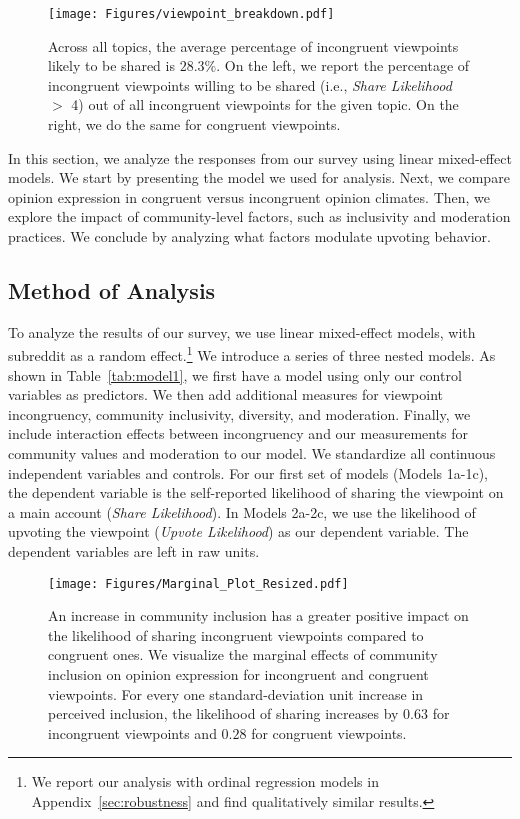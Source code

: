 \begin{figure*}[ht]
    \centering
    \texttt{[image: Figures/viewpoint\_breakdown.pdf]}
    \caption{Across all topics, the average percentage of incongruent viewpoints likely to be shared is $28.3\%$. On the left, we report the percentage of incongruent viewpoints willing to be shared (i.e., \textit{Share Likelihood} $>$ 4) out of all incongruent viewpoints for the given topic. On the right, we do the same for congruent viewpoints.}
    \label{fig:viewpoint_breakdown}
\end{figure*}

In this section, we analyze the responses from our survey using linear mixed-effect models. We start by presenting the model we used for analysis. Next, we compare opinion expression in congruent versus incongruent opinion climates. Then, we explore the impact of community-level factors, such as inclusivity and moderation practices. We conclude by analyzing what factors modulate upvoting behavior.

\subsection{Method of Analysis}
To analyze the results of our survey, we use linear mixed-effect models, with subreddit as a random effect.\footnote{We report our analysis with ordinal regression models in Appendix~\ref{sec:robustness} and find qualitatively similar results.} We introduce a series of three nested models. As shown in Table~\ref{tab:model1}, we first have a model using only our control variables as predictors. We then add additional measures for viewpoint incongruency, community inclusivity, diversity, and moderation. Finally, we include interaction effects between incongruency and our measurements for community values and moderation to our model. We standardize all continuous independent variables and controls. For our first set of models (Models 1a-1c), the dependent variable is the self-reported likelihood of sharing the viewpoint on a main account (\textit{Share Likelihood}). In Models 2a-2c, we use the likelihood of upvoting the viewpoint (\textit{Upvote Likelihood}) as our dependent variable. The dependent variables are left in raw units. 










\begin{figure}[ht!]
    \centering
    \texttt{[image: Figures/Marginal\_Plot\_Resized.pdf]}
    \caption{An increase in community inclusion has a greater positive impact on the likelihood of sharing incongruent viewpoints compared to congruent ones. We visualize the marginal effects of community inclusion on opinion expression for incongruent and congruent viewpoints. For every one standard-deviation unit increase in perceived inclusion, the likelihood of sharing increases by $0.63$ for incongruent viewpoints and $0.28$ for congruent viewpoints.}
    \label{fig:marginal}
\end{figure}

